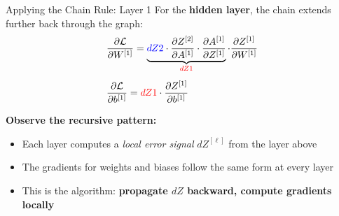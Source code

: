 \documentclass[aspectratio=169]{beamer}
\begin{document}
\begin{frame}{Applying the Chain Rule: Layer 1}
For the \textbf{hidden layer}, the chain extends further back through the graph:
\begin{align*}
&\frac{\partial \mathcal{L}}{\partial W^{[1]}} = \underbrace{\textcolor{blue}{dZ2} \cdot \frac{\partial Z^{[2]}}{\partial A^{[1]}} \cdot \frac{\partial A^{[1]}}{\partial Z^{[1]}}}_{\textcolor{red}{dZ1}} \cdot \frac{\partial Z^{[1]}}{\partial W^{[1]}}
\\[0.5em]
&\frac{\partial \mathcal{L}}{\partial b^{[1]}} = \textcolor{red}{dZ1} \cdot \frac{\partial Z^{[1]}}{\partial b^{[1]}}
\end{align*}

\medskip
\textbf{Observe the recursive pattern:}
\begin{itemize}
\item Each layer computes a \textit{local error signal} $dZ^{[\ell]}$ from the layer above
\item The gradients for weights and biases follow the same form at every layer
\item This is the algorithm: \textbf{propagate $dZ$ backward, compute gradients locally}
\end{itemize}
\end{frame}
%
%
\end{document}
